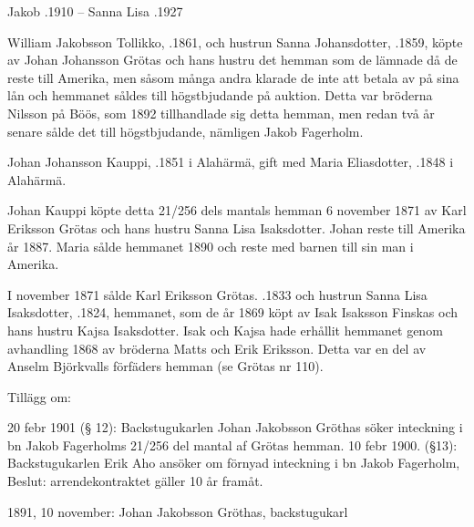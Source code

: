Jakob .1910  --  Sanna Lisa .1927


William Jakobsson Tollikko, .1861, och hustrun Sanna Johansdotter, .1859, köpte av  Johan Johansson Grötas och hans hustru det hemman som de lämnade då de reste till Amerika, men såsom många andra klarade de inte att betala av på sina lån och hemmanet såldes till högstbjudande på auktion. Detta var bröderna Nilsson på Böös, som 1892 tillhandlade sig detta hemman, men redan två år senare sålde det till högstbjudande, nämligen Jakob Fagerholm.


Johan Johansson Kauppi, .1851 i Alahärmä, gift med Maria Eliasdotter, .1848 i Alahärmä.
\begin{jhchildren}
  \item {}
  \item {}
  \item {}
  \item {}
\end{jhchildren}
Johan Kauppi köpte detta 21/256 dels mantals hemman 6 november 1871 av Karl Eriksson Grötas och hans hustru Sanna Lisa Isaksdotter. Johan reste till Amerika år 1887. Maria sålde hemmanet 1890 och reste med barnen till sin man i Amerika.


I november 1871 sålde Karl Eriksson Grötas. .1833 och hustrun Sanna Lisa Isaksdotter, .1824, hemmanet, som de år 1869 köpt av Isak Isaksson Finskas och hans hustru Kajsa Isaksdotter. Isak och Kajsa hade erhållit hemmanet genom avhandling 1868 av bröderna Matts och Erik Eriksson. Detta var en del av Anselm 				Björkvalls förfäders hemman (se Grötas nr 110).



Tillägg om:


20 febr 1901 (§ 12): Backstugukarlen Johan Jakobsson Gröthas söker inteckning i bn Jakob Fagerholms 21/256 del mantal af Grötas hemman. 10 febr 1900. (§13): Backstugukarlen Erik Aho ansöker om förnyad inteckning i bn Jakob Fagerholm, Beslut: arrendekontraktet gäller 10 år framåt.

1891, 10 november: Johan Jakobsson Gröthas, backstugukarl

